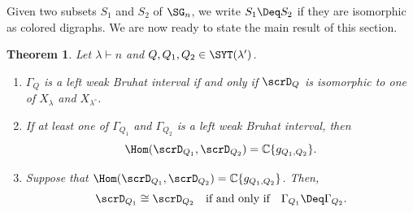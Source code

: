 \documentclass[12pt, reqno]{amsart}
\theoremstyle{plain}
\newtheorem{theorem}{Theorem}[section]
\theoremstyle{definition}
\numberwithin{equation}{section}
\numberwithin{figure}{section}
\numberwithin{table}{section}
\def\C{\mathbb C}
\begin{document}
Given two subsets $S_1$ and $ S_2$ of  $\SG_n$, we write $S_1 \Deq S_2$ if they are isomorphic as colored digraphs.
We are now ready to state the main result of this section.
\begin{theorem}\label{thm: new thm for D Q iso to X}
Let $\lambda\vdash n$ and $Q, Q_1, Q_2 \in \SYT(\lambda')$. 
\begin{enumerate}[label={\rm (\arabic*)}]
\item
$\Gamma_Q$ is a left weak Bruhat interval if and only if $\scrD_Q$ is isomorphic to one of $X_\lambda$ and $X_{\lambda^\circ}$.

\item If at least one of $\Gamma_{Q_1}$ and $\Gamma_{Q_2}$ is a left weak Bruhat interval, then
\[
\Hom(\scrD_{Q_1},\scrD_{Q_2}) = \C\{g_{Q_1,Q_2}\}.
\]

\item Suppose that $ \Hom(\scrD_{Q_1}, \scrD_{Q_2}) = \C\{g_{Q_1, Q_2}\}$. 
Then, 
\begin{align*}
\scrD_{Q_1} \cong \scrD_{Q_2} \quad\text{if and only if}\quad \Gamma_{Q_1} \Deq \Gamma_{Q_2}.
\end{align*}
\end{enumerate}
\end{theorem}
\end{document}

